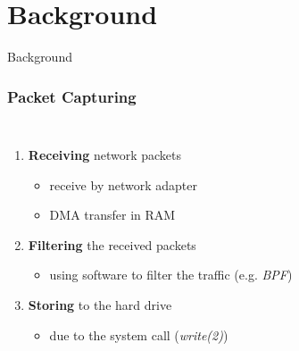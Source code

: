 \documentclass{beamer}
\begin{document}
\section{Background}
\begin{frame}
	\begin{center}
	\huge{Background}
	\end{center}
\end{frame}

\begin{frame}
\frametitle{Packet Capturing}
\begin{columns}
\vspace{-15em}
\begin{enumerate}
	\item \textbf{Receiving} network packets
		\begin{itemize}
			\item receive by network adapter
			\item DMA transfer in RAM \newline
		\end{itemize}
	\item \textbf{Filtering} the received packets 
		\begin{itemize}
			\item using software to filter the traffic (e.g. \emph{BPF})\newline
		\end{itemize}
	\item \textbf{Storing} to the hard drive
		\begin{itemize}
			\item due to the system call (\emph{write(2)})
		\end{itemize}
\end{enumerate}

\end{columns}
\end{frame}
\end{document}
